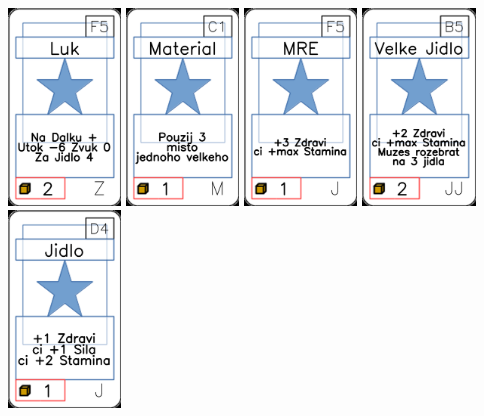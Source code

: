 \documentclass[a4paper]{article}
\begin{document}
	\includegraphics[width=3.0cm]{img-1_89}
	\includegraphics[width=3.0cm]{img-1_40}
	\includegraphics[width=3.0cm]{img-1_29}
	\includegraphics[width=3.0cm]{img-1_39}
	\includegraphics[width=3.0cm]{img-1_18}
\end{document}
